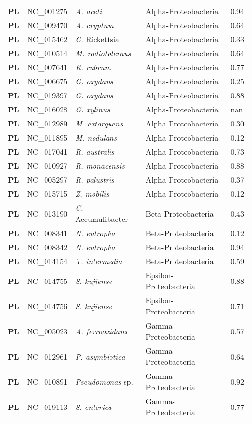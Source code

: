 \begin{adjustwidth}{-3cm}{2cm}
{\begin{supertabular}{>{\bfseries}l|p{0.1\textwidth}p{0.14\textwidth}l|l}
PL & NC\_001275 & \textit{A. aceti }& Alpha-Proteobacteria & 0.94\\
PL & NC\_009470 & \textit{A. cryptum} & Alpha-Proteobacteria & 0.64\\
PL & NC\_015462 & \textit{C.} Rickettsia & Alpha-Proteobacteria & 0.33\\
PL & NC\_010514 & \textit{M. radiotolerans} & Alpha-Proteobacteria & 0.64\\
PL & NC\_007641 & \textit{R. rubrum} & Alpha-Proteobacteria & 0.77\\
PL & NC\_006675 & \textit{G. oxydans} & Alpha-Proteobacteria & 0.25\\
PL & NC\_019397 & \textit{G. oxydans} & Alpha-Proteobacteria & 0.88\\
PL & NC\_016028 & \textit{G. xylinus} & Alpha-Proteobacteria & nan\\
PL & NC\_012989 & \textit{M. extorquens} & Alpha-Proteobacteria & 0.30\\
PL & NC\_011895 & \textit{M. nodulans} & Alpha-Proteobacteria & 0.12\\
PL & NC\_017041 & \textit{R. australis} & Alpha-Proteobacteria & 0.73\\
PL & NC\_010927 & \textit{R. monacensis} & Alpha-Proteobacteria & 0.88\\
PL & NC\_005297 & \textit{R. palustris} & Alpha-Proteobacteria & 0.37\\
PL & NC\_015715 & \textit{Z. mobilis} & Alpha-Proteobacteria & 0.12\\
PL & NC\_013190 & \textit{C.} Accumulibacter & Beta-Proteobacteria & 0.43\\
PL & NC\_008341 & \textit{N. eutropha} & Beta-Proteobacteria & 0.12\\
PL & NC\_008342 & \textit{N. eutropha} & Beta-Proteobacteria & 0.94\\
PL & NC\_014154 & \textit{T. intermedia} & Beta-Proteobacteria & 0.59\\
PL & NC\_014755 & \textit{S. kujiense} & Epsilon-Proteobacteria & 0.88\\
PL & NC\_014756 & \textit{S. kujiense} & Epsilon-Proteobacteria & 0.71\\
PL & NC\_005023 & \textit{A. ferrooxidans} & Gamma-Proteobacteria & 0.57\\
PL & NC\_012961 & \textit{P. asymbiotica} & Gamma-Proteobacteria & 0.64\\
PL & NC\_010891 & \textit{Pseudomonas} sp. & Gamma-Proteobacteria & 0.92\\
PL & NC\_019113 & \textit{S. enterica} & Gamma-Proteobacteria & 0.77\\

\end{supertabular}}
\end{adjustwidth}
